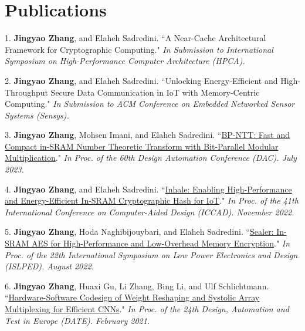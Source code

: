 \documentclass[letterpaper,11pt]{article}
\newcommand{\resumeSubHeadingListStart}{\begin{itemize}[leftmargin=0.15in, label={}]}
\newcommand{\resumeSubHeadingListEnd}{\end{itemize}}
\begin{document}
\section{Publications}
  \vspace{2pt}
  \resumeSubHeadingListStart
    \small{\item{
        1. \textbf{Jingyao Zhang}, and Elaheh Sadredini. ``A Near-Cache Architectural Framework for Cryptographic Computing." \textit{In Submission to International Symposium on High-Performance Computer Architecture (HPCA).} 
        \\ \vspace{3pt}
    
        2. \textbf{Jingyao Zhang}, and Elaheh Sadredini. ``Unlocking Energy-Efficient and High-Throughput Secure Data Communication in IoT with Memory-Centric Computing." \textit{In Submission to ACM Conference on Embedded Networked Sensor Systems (Sensys).} 
        \\ \vspace{3pt}
    
        3. \textbf{Jingyao Zhang}, Mohsen Imani, and Elaheh Sadredini. ``\href{https://arxiv.org/pdf/2303.00173.pdf}{BP-NTT: Fast and Compact in-SRAM Number Theoretic Transform with Bit-Parallel Modular Multiplication}." \textit{In Proc. of the 60th Design Automation Conference (DAC). July 2023.} 
        \\ \vspace{3pt}
        
        4. \textbf{Jingyao Zhang}, and Elaheh Sadredini. ``\href{https://arxiv.org/pdf/2208.07570.pdf}{Inhale: Enabling High-Performance and Energy-Efficient In-SRAM Cryptographic Hash for IoT}." \textit{In Proc. of the 41th International Conference on Computer-Aided Design (ICCAD). November 2022.}  \\ \vspace{3pt}
        
        5. \textbf{Jingyao Zhang}, Hoda Naghibijouybari, and Elaheh Sadredini. ``\href{https://arxiv.org/pdf/2207.01298.pdf}{Sealer: In-SRAM AES for High-Performance and Low-Overhead Memory Encryption}." \textit{In Proc. of the 22th International Symposium on Low Power Electronics and Design (ISLPED). August 2022.}  \\ \vspace{3pt}
        
        6. \textbf{Jingyao Zhang}, Huaxi Gu, Li Zhang, Bing Li, and Ulf Schlichtmann. ``\href{https://drive.google.com/file/d/1vOt_0eP0xW03lu6KngMNexirfjsxyFDI/view}{Hardware-Software Codesign of Weight Reshaping and Systolic Array Multiplexing for Efficient CNNs}." \textit{In Proc. of the 24th Design, Automation and Test in Europe (DATE). February 2021.} 
    }}
  \resumeSubHeadingListEnd
\end{document}
